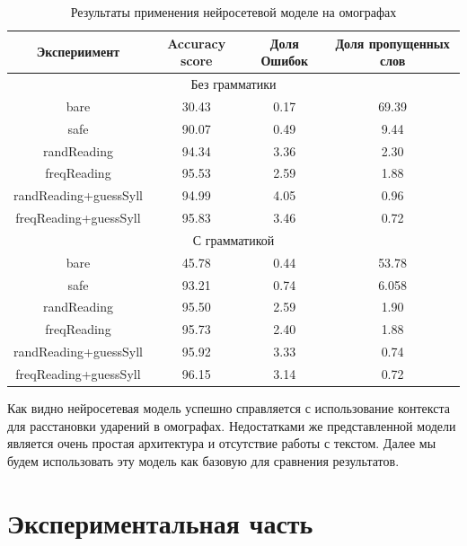 \documentclass[14pt, a4paper, russian]{report}
\begin{document}
\begin{normalsize}
\begin{table}[H]
	\begin{small}
		\begin{center}
			\begin{tabular}{|c|c|c|c|}
				\hline
				Экспериимент & Accuracy score & Доля Ошибок & Доля пропущенных слов\\
				\hline
				\multicolumn{4}{|c|}{Без грамматики} \\			
				\hline
				bare & 30.43 & 0.17 & 69.39 \\
				\hline
				safe & 90.07 & 0.49 & 9.44 \\
				\hline
				randReading &94.34 &3.36 &2.30 \\
				\hline
				freqReading &95.53 &2.59& 1.88 \\
				\hline
				randReading+guessSyll &94.99 &4.05 &0.96 \\
				\hline
				freqReading+guessSyll & 95.83 &3.46 &0.72\\
				\hline
				\multicolumn{4}{|c|}{С грамматикой} \\			
				\hline
				bare &45.78 & 0.44 &53.78\\
				\hline
				safe &93.21& 0.74 &6.058 \\
				\hline
				randReading &95.50 &2.59 &1.90 \\
				\hline
				freqReading &95.73 &2.40 &1.88 \\
				\hline
				randReading+guessSyll &95.92 &3.33 &0.74 \\
				\hline
				freqReading+guessSyll &96.15 &3.14 &0.72 \\
				\hline
				
			\end{tabular}
		\end{center}
	\end{small}
	\caption{Результаты применения нейросетевой моделе на омографах}
	\label{table:base_homo}
\end{table}

Как видно нейросетевая модель успешно справляется с использование контекста для расстановки ударений в омографах. Недостатками же представленной модели является очень простая архитектура и отсутствие работы с текстом. Далее мы будем использовать эту модель как базовую для сравнения результатов. 


\newpage
\chapter{Экспериментальная часть}

\end{normalsize}
\end{document}
